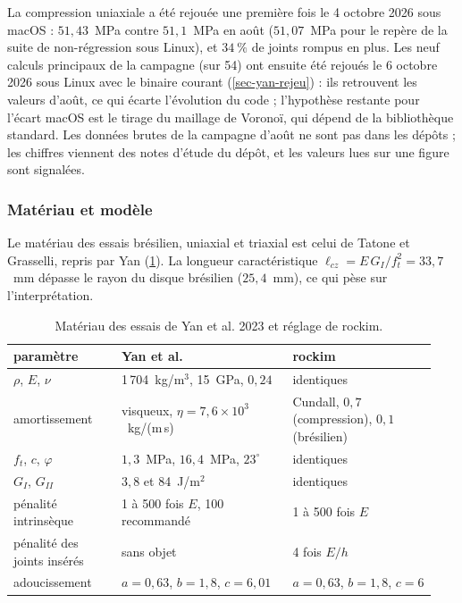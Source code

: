 La compression uniaxiale a été rejouée une première fois le 4 octobre 2026 sous macOS : $51{,}43$~MPa contre $51{,}1$~MPa en août ($51{,}07$~MPa pour le repère de la suite de non-régression sous Linux), et $34~\%$ de joints rompus en plus. Les neuf calculs principaux de la campagne (sur 54) ont ensuite été rejoués le 6 octobre 2026 sous Linux avec le binaire courant (\cref{sec-yan-rejeu}) : ils retrouvent les valeurs d'août, ce qui écarte l'évolution du code ; l'hypothèse restante pour l'écart macOS est le tirage du maillage de Voronoï, qui dépend de la bibliothèque standard. Les données brutes de la campagne d'août ne sont pas dans les dépôts ; les chiffres viennent des notes d'étude du dépôt, et les valeurs lues sur une figure sont signalées.

\subsubsection{Matériau et modèle}

Le matériau des essais brésilien, uniaxial et triaxial est celui de Tatone et Grasselli, repris par Yan (\cref{tab-yan-mat}). La longueur caractéristique $\ell_{cz} = E\,G_I/f_t^2 = 33{,}7$~mm dépasse le rayon du disque brésilien ($25{,}4$~mm), ce qui pèse sur l'interprétation.

\begin{table}[htbp]
\centering
\caption{Matériau des essais de Yan et al. 2023 et réglage de rockim.}
\label{tab-yan-mat}
\small
\begin{tabular}{@{}p{0.24\linewidth}p{0.38\linewidth}p{0.32\linewidth}@{}}
\toprule
paramètre & Yan et al. & rockim \\
\midrule
$\rho$, $E$, $\nu$ & 1\,704~kg/m$^3$, 15~GPa, $0{,}24$ & identiques \\
amortissement & visqueux, $\eta = 7{,}6\times10^3$~kg/(m\,s) & Cundall, $0{,}7$ (compression), $0{,}1$ (brésilien) \\
$f_t$, $c$, $\varphi$ & $1{,}3$~MPa, $16{,}4$~MPa, $23^\circ$ & identiques \\
$G_I$, $G_{II}$ & $3{,}8$ et 84~J/m$^2$ & identiques \\
pénalité intrinsèque & 1 à 500 fois $E$, 100 recommandé & 1 à 500 fois $E$ \\
pénalité des joints insérés & sans objet & 4 fois $E/h$ \\
adoucissement & $a = 0{,}63$, $b = 1{,}8$, $c = 6{,}01$ & $a = 0{,}63$, $b = 1{,}8$, $c = 6$ \\
\bottomrule
\end{tabular}
\end{table}

